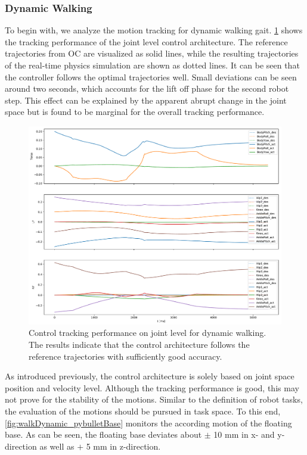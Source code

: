 \subsubsection{Dynamic Walking}
To begin with, we analyze the motion tracking for dynamic walking gait. \cref{fig:walkDynamic_pybulletTracking} shows the tracking performance of the joint level control architecture. The reference trajectories from \gls{OC} are visualized as solid lines, while the resulting trajectories of the real-time physics simulation are shown as dotted lines. It can be seen that the controller follows the optimal trajectories well. Small deviations can be seen around two seconds, which accounts for the lift off phase for the second robot step. This effect can be explained by the apparent abrupt change in the joint space but is found to be marginal for the overall tracking performance. 
\begin{figure}
\centering	
\includegraphics[width=.85\textwidth]{fig/walkDynamic/pybullet/pybulletTracking}
\caption[Control tracking performance on joint level for dynamic walking]{Control tracking performance on joint level for dynamic walking. The results indicate that the control architecture follows the reference trajectories with sufficiently good accuracy.}
\label{fig:walkDynamic_pybulletTracking}
\end{figure}
As introduced previously, the control architecture is solely based on joint space position and velocity level. Although the tracking performance is good, this may not prove for the stability of the motions. Similar to the definition of robot tasks, the evaluation of the motions should be pursued in task space. To this end, \cref{fig:walkDynamic_pybulletBase} monitors the according motion of the floating base. As can be seen, the floating base deviates about $\pm$ 10 mm in x- and y-direction as well as $+$ 5 mm in z-direction. 
